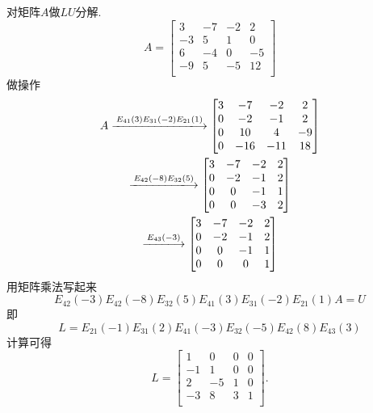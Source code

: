 \begin{example}
    对矩阵$A$做$LU$分解.
    \begin{equation}
      A = \begin{bmatrix}
       3 & -7 & -2 & 2\\
       -3 & 5 & 1 & 0\\
       6 & -4 & 0 & -5\\
       -9 & 5 & -5 & 12\\
      \end{bmatrix}
    \end{equation}
    做操作
    \begin{equation}
        \begin{gathered}
            A \xlongrightarrow{E_{41}(3)E_{31}(-2)E_{21}(1)} 
            \begin{bmatrix}
             3 & -7 & -2 & 2\\
             0 & -2 & -1 & 2\\
             0 & 10 & 4 & -9\\
             0 & -16 & -11 & 18\\
            \end{bmatrix}
            \\
            \xlongrightarrow{E_{42}(-8)E_{32}(5)}
            \begin{bmatrix}
             3 & -7 & -2 & 2\\
             0 & -2 & -1 & 2\\
             0 & 0 & -1 & 1\\
             0 & 0 & -3 & 2\\
            \end{bmatrix}
            \\
            \xlongrightarrow{E_{43}(-3)}
            \begin{bmatrix}
             3 & -7 & -2 & 2\\
             0 & -2 & -1 & 2\\
             0 & 0 & -1 & 1\\
             0 & 0 & 0 & 1\\
            \end{bmatrix}
        \end{gathered}
    \end{equation}
    用矩阵乘法写起来
    \begin{equation}
      E_{42}(-3)E_{42}(-8)E_{32}(5)E_{41}(3)E_{31}(-2)E_{21}(1)A = U
    \end{equation}
    即
    \begin{equation}
      L = E_{21}(-1) E_{31}(2)E_{41}(-3)E_{32}(-5)E_{42}(8)E_{43}(3)
    \end{equation}
    计算可得
    \begin{equation}
      L = \begin{bmatrix}
       1 & 0 & 0 & 0\\
       -1 & 1 & 0 & 0\\
       2 & -5 & 1 & 0\\
       -3 & 8 & 3 & 1\\
      \end{bmatrix}.
    \end{equation}
\end{example}


